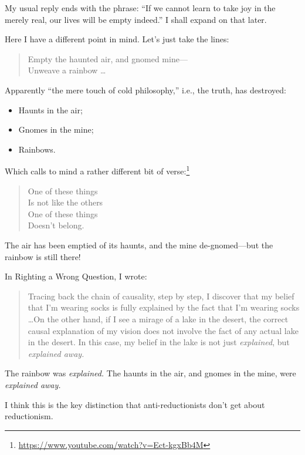 {
 My usual reply ends with the phrase: ``If we
cannot learn to take joy in the merely real, our lives will be empty
indeed.'' I shall expand on that later.}

{
 Here I have a different point in mind. Let's just
take the lines:}

\begin{verse}
 Empty the haunted air, and gnomed mine---\\
 Unweave a rainbow \ldots\\
\end{verse}

{
 Apparently ``the mere touch of cold
philosophy,'' i.e., the truth, has destroyed:}

\begin{itemize}
\item Haunts in the air;
\item Gnomes in the mine;
\item Rainbows.
\end{itemize}

{
 Which calls to mind a rather different bit of verse:\footnote{\url{https://www.youtube.com/watch?v=Ect-kgxBb4M}}}

\begin{verse}
 One of these things\\
 Is not like the others\\
 One of these things\\
 Doesn't belong.\\
\end{verse}

{
 The air has been emptied of its haunts, and the mine
de-gnomed---but the rainbow is still there!}

{
 In Righting a Wrong Question, I wrote:}

\begin{quote}
{
 Tracing back the chain of causality, step by step, I discover that
my belief that I'm wearing socks is fully explained by
the fact that I'm wearing socks \ldots On the other
hand, if I see a mirage of a lake in the desert, the correct causal
explanation of my vision does not involve the fact of any actual lake
in the desert. In this case, my belief in the lake is not just
\textit{explained}, but \textit{explained away.}}
\end{quote}

{
 The rainbow was \textit{explained.} The haunts in the air, and
gnomes in the mine, were \textit{explained away.}}

{
 I think this is the key distinction that anti-reductionists
don't get about reductionism.}

